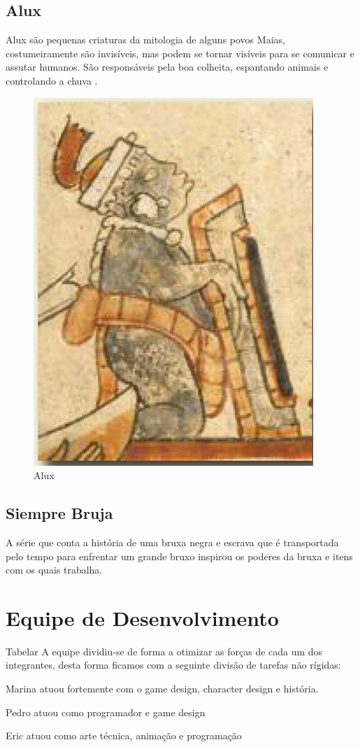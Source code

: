 \subsection{Alux}
Alux são pequenas criaturas da mitologia de alguns povos Maias, costumeiramente são invisíveis, mas podem se tornar visíveis para se comunicar e assutar humanos.  São responsáveis pela boa colheita, espantando animais e controlando a chuva \cite{judith_2009}. 
\begin{figure}[htb]
	\caption{\label{fig_grafico}Alux}
	\begin{center}
	    \includegraphics[scale=0.5]{imagens/alux.jpg}
	\end{center}
\end{figure}
\vfill
\pagebreak

\subsection{Siempre Bruja}
A série que conta a história de uma bruxa negra e escrava que é transportada  pelo tempo para enfrentar um grande bruxo inspirou os poderes da bruxa e itens com os quais trabalha. 

\section{Equipe de Desenvolvimento}
Tabelar
A equipe dividiu-se de forma a otimizar as forças de cada um dos integrantes, desta forma ficamos com a seguinte divisão de tarefas não rígidas:

Marina atuou fortemente com o game design, character design e história. 

Pedro atuou como programador e game design

Eric atuou como arte técnica, animação e programação
